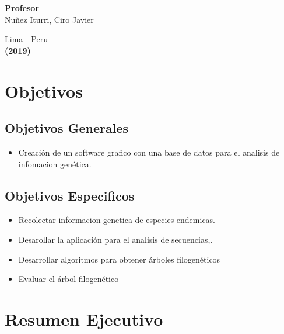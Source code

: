 \documentclass[a4paper]{article}
\begin{document}
\begin{titlepage}
\begin{center}
\begin{large}
{\bf Profesor} 
\vspace*{0.1in}
\\Nuñez Iturri, Ciro Javier
\end{large}

\end{center}
\begin{center}
\begin{large}
\vspace*{1.0in}
Lima - Peru\\
{\bf (2019)}
\end{large}
\end{center}
\end{titlepage}

\pagebreak
\tableofcontents
\pagebreak

\section{Objetivos}

\subsection{Objetivos Generales}
\begin{itemize}
\item  Creación de un software grafico con una base de datos para el analisis de infomacion genética.
\end{itemize}

\subsection{Objetivos Especificos}
\begin{itemize}
\item Recolectar informacion genetica de especies endemicas.

\item Desarollar la aplicación  para el analisis de secuencias,.

\item Desarrollar algoritmos para obtener árboles filogenéticos 

\item Evaluar el árbol filogenético
\end{itemize}

\section{Resumen Ejecutivo}
\end{document}
